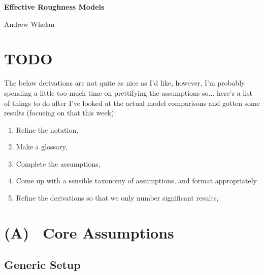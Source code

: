 \documentclass{article}
\begin{document}
\renewcommand{\thesection}{\Alph{section}}
\begin{titlepage}
   \centering
   \vspace*{\fill}  %

   {\Huge\bfseries Effective Roughness Models \par}
   \vspace{1cm}

   {\Large Andrew Whelan \par}
   \vspace{0.5cm}

   {\large \date{\today} \par}

   \vspace*{\fill}  %
\end{titlepage}

\section*{TODO}
The below derivations are not quite as nice as I'd like, however, I'm probably
spending a little too much time on prettifying the assumptions so... here's a list of
things to do after I've looked at the actual model comparisons and gotten some
results (focusing on that this week):
\begin{enumerate}
   \item Refine the notation,
   \item Make a glossary,
   \item Complete the assumptions,
   \item Come up with a sensible taxonomy of assumptions, and format appropriately
   \item Refine the derivations so that we only number significant results,
\end{enumerate}
\newpage
\setcounter{section}{1}   %
\setcounter{subsection}{-1}
\setcounter{equation}{-1}  %
\section*{(A) \ Core Assumptions}

\subsection{Generic Setup}
\end{document}
